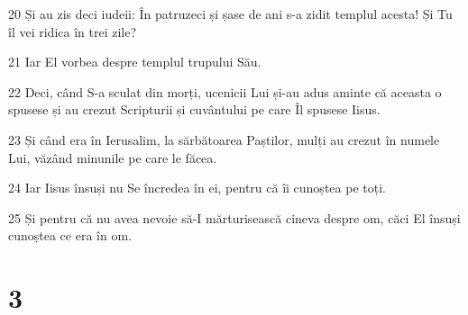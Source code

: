 \par 20 Și au zis deci iudeii: În patruzeci și șase de ani s-a zidit templul acesta! Și Tu îl vei ridica în trei zile?
\par 21 Iar El vorbea despre templul trupului Său.
\par 22 Deci, când S-a sculat din morți, ucenicii Lui și-au adus aminte că aceasta o spusese și au crezut Scripturii și cuvântului pe care Îl spusese Iisus.
\par 23 Și când era în Ierusalim, la sărbătoarea Paștilor, mulți au crezut în numele Lui, văzând minunile pe care le făcea.
\par 24 Iar Iisus însuși nu Se încredea în ei, pentru că îi cunoștea pe toți.
\par 25 Și pentru că nu avea nevoie să-I mărturisească cineva despre om, căci El însuși cunoștea ce era în om.

\chapter{3}

